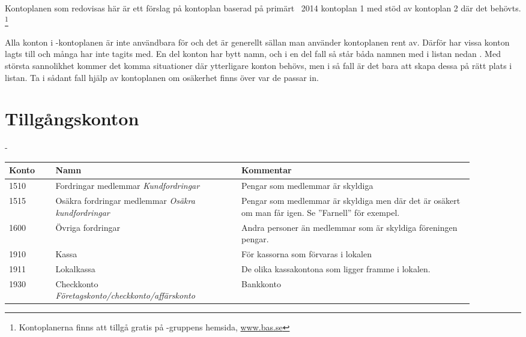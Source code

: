 Kontoplanen som redovisas här är ett förslag på kontoplan baserad på primärt ~2014 kontoplan 1 med stöd av kontoplan 2 där det behövts. \footnote{Kontoplanerna finns att tillgå gratis på -gruppens hemsida, \url{www.bas.se}}

Alla konton i -kontoplanen är inte användbara för  och det är generellt sällan man använder kontoplanen rent av. 
Därför har vissa konton lagts till och många har inte tagits med. En del konton har bytt namn, och i en del fall så står båda namnen med i listan nedan . Med största sannolikhet kommer det komma situationer där ytterligare konton behövs, men i så fall är det bara att skapa dessa på rätt plats i listan. Ta i sådant fall hjälp av  kontoplanen om osäkerhet finns över var de passar in.


\section{Tillgångskonton}
\begin{addmargin*}[0em]{-\overhang}
		\begin{longtable}[l]{l p{0.4\linewidth} p{0.5\linewidth}}
		Konto	&	Namn								& Kommentar \\ \toprule \endhead
		1510	&	Fordringar medlemmar \newline \emph{Kundfordringar} & Pengar som medlemmar är skyldiga \acr{eta}\\
		1515	&	Osäkra fordringar medlemmar \newline \emph{Osäkra kundfordringar}	& Pengar som medlemmar är skyldiga men där det är osäkert om man får igen. \newline Se ”Farnell” för exempel.\\
		1600	&	Övriga fordringar					& Andra personer än medlemmar som är skyldiga föreningen pengar.\\
		1910	&	Kassa								& För kassorna som förvaras i lokalen\\
		1911	&	Lokalkassa							& De olika kassakontona som ligger framme i lokalen.\\
		1930	&	Checkkonto \newline \emph{Företagskonto/checkkonto/affärskonto}	& Bankkonto\\
	\end{longtable}
\end{addmargin*}

